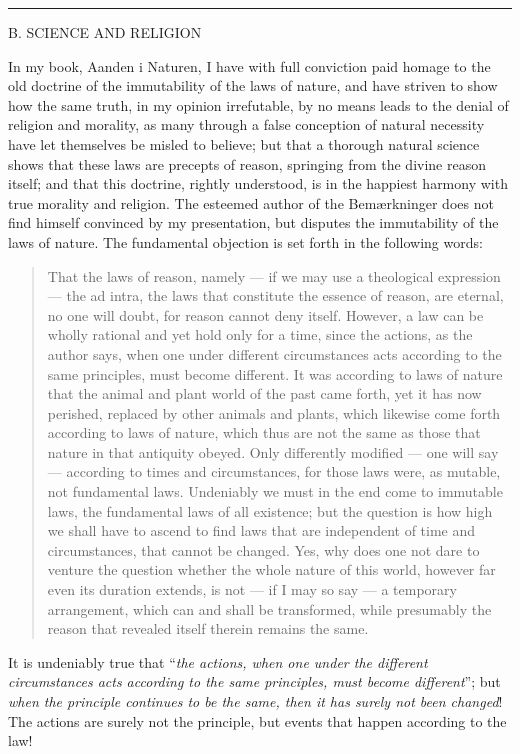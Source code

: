 \documentclass[12pt,a4paper,openany]{book}
\newcommand{\opage}[1]{\marginnote{\footnotesize\textit{[#1]}}}
\newcommand{\excerpthead}[1]{\par\bigskip\begin{center}#1\end{center}\nopagebreak\smallskip}
\newenvironment{smallquote}{\begin{quote}}{\end{quote}}
\newcommand{\sectionrule}{\par\begin{center}\rule{4em}{0.4pt}\end{center}}
\begin{document}
\sectionrule

\excerpthead{B. SCIENCE AND RELIGION}


In my book, Aanden i Naturen, I have with full conviction paid homage to the old
doctrine of the immutability of the laws of nature, and have striven to show how the
same truth, in my
\setcounter{footnote}{0}%
\opage{68}opinion irrefutable, by no means leads to the denial of religion
and morality, as many through a false conception of natural necessity have let
themselves be misled to believe; but that a thorough natural science shows that
these laws are precepts of reason, springing from the divine reason itself; and that
this doctrine, rightly understood, is in the happiest harmony with true morality and
religion. The esteemed author of the Bemærkninger does not find himself convinced by
my presentation, but disputes the immutability of the laws of nature. The
fundamental objection is set forth in the following words:

\begin{smallquote}

That the laws of reason, namely --- if we may use a theological expression --- the
ad intra, the laws that constitute the essence of reason, are eternal, no one will
doubt, for reason cannot deny itself. However, a law can be wholly rational and yet
hold only for a time, since the actions, as the author says, when one under
different circumstances acts according to the same principles, must become
different. It was according to laws of nature that the animal and plant world of the
past came forth, yet it has now perished, replaced by other animals and plants,
which likewise come forth according to laws of nature, which thus are not the same
as those that nature in that antiquity obeyed. Only differently modified --- one
will say --- according to times and circumstances, for those laws were, as mutable,
not fundamental laws. Undeniably we must in the end come to immutable laws, the
fundamental laws of all existence; but the question is how high we shall have to
ascend to find laws that are independent of time and circumstances, that cannot be
changed. Yes, why does one not dare to venture the question whether the whole nature
of this world, however far even its duration extends, is not --- if I may so
say --- a temporary arrangement, which can and shall be transformed, while
presumably the reason that revealed itself therein remains the same.
\end{smallquote}

It is undeniably true that ``\emph{the actions, when one under the different
circumstances acts according to the same principles, must become
different}''; but \emph{when the principle continues to be the same, then it
has surely not been changed}! The actions are surely not the principle, but events
that happen according to the law!
\end{document}
